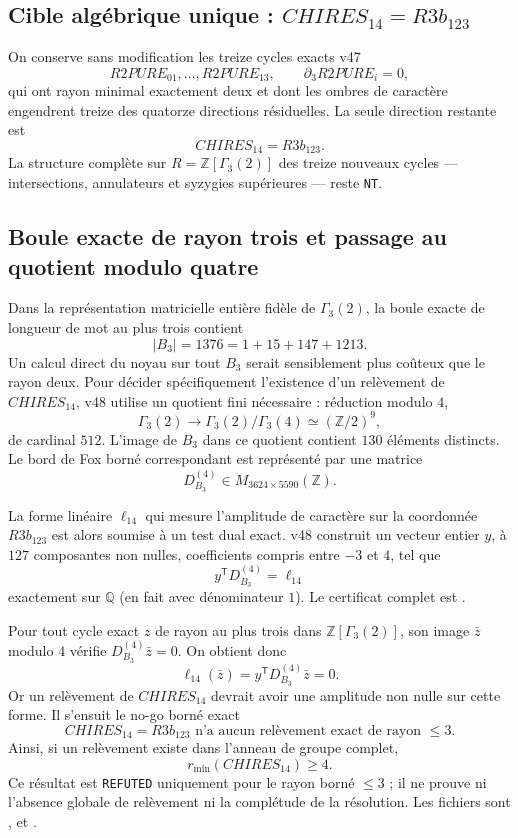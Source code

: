 \documentclass[11pt,a4paper]{article}
\newcommand{\certRefuted}{\texttt{REFUTED}}
\newcommand{\certNT}{\texttt{NT}}
\begin{document}
\subsection{Cible algébrique unique : $CHIRES_{14}=R3b_{123}$}

On conserve sans modification les treize cycles exacts v47
\[
 R2PURE_{01},\ldots,R2PURE_{13},
 \qquad \partial_3R2PURE_i=0,
\]
qui ont rayon minimal exactement deux et dont les ombres de caractère engendrent treize des quatorze directions résiduelles. La seule direction restante est
\[
 \boxed{CHIRES_{14}=R3b_{123}.}
\]
La structure complète sur $R=\mathbb Z[\Gamma_3(2)]$ des treize nouveaux cycles --- intersections, annulateurs et syzygies supérieures --- reste \certNT.

\subsection{Boule exacte de rayon trois et passage au quotient modulo quatre}

Dans la représentation matricielle entière fidèle de $\Gamma_3(2)$, la boule exacte de longueur de mot au plus trois contient
\[
 \boxed{|B_3|=1376=1+15+147+1213.}
\]
Un calcul direct du noyau sur tout $B_3$ serait sensiblement plus coûteux que le rayon deux. Pour décider spécifiquement l'existence d'un relèvement de $CHIRES_{14}$, v48 utilise un quotient fini nécessaire : réduction modulo $4$,
\[
 \Gamma_3(2)\longrightarrow\Gamma_3(2)/\Gamma_3(4)
 \simeq (\mathbb Z/2)^9,
\]
de cardinal $512$. L'image de $B_3$ dans ce quotient contient $130$ éléments distincts. Le bord de Fox borné correspondant est représenté par une matrice
\[
 \boxed{D^{(4)}_{B_3}\in M_{3624\times5590}(\mathbb Z).}
\]

La forme linéaire $\ell_{14}$ qui mesure l'amplitude de caractère sur la coordonnée $R3b_{123}$ est alors soumise à un test dual exact. v48 construit un vecteur entier $y$, à $127$ composantes non nulles, coefficients compris entre $-3$ et $4$, tel que
\[
 \boxed{y^{\mathsf T}D^{(4)}_{B_3}=\ell_{14}}
\]
exactement sur $\mathbb Q$ (en fait avec dénominateur $1$). Le certificat complet est .

Pour tout cycle exact $z$ de rayon au plus trois dans $\mathbb Z[\Gamma_3(2)]$, son image $\bar z$ modulo $4$ vérifie $D^{(4)}_{B_3}\bar z=0$. On obtient donc
\[
 \ell_{14}(\bar z)=y^{\mathsf T}D^{(4)}_{B_3}\bar z=0.
\]
Or un relèvement de $CHIRES_{14}$ devrait avoir une amplitude non nulle sur cette forme. Il s'ensuit le no-go borné exact
\[
 \boxed{
 CHIRES_{14}=R3b_{123}
 \text{ n'a aucun relèvement exact de rayon }\le3.}
\]
Ainsi, si un relèvement existe dans l'anneau de groupe complet,
\[
 \boxed{r_{\min}(CHIRES_{14})\ge4.}
\]
Ce résultat est \certRefuted{} uniquement pour le rayon borné $\le3$ ; il ne prouve ni l'absence globale de relèvement ni la complétude de la résolution. Les fichiers sont ,  et .
\end{document}
